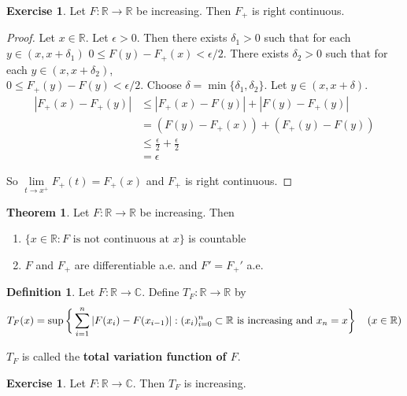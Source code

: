 \documentclass[12pt]{amsart}
\theoremstyle{definition}
\newtheorem{defn}[definition]{Definition}
\newtheorem{thm}[definition]{Theorem}
\newtheorem{ex}[definition]{Exercise}
\newcommand{\del}{\delta}
\newcommand{\ep}{\epsilon}
\newcommand{\C}{\mathbb{C}}
\newcommand{\R}{\mathbb{R}}
\newcommand{\lex}[1]{\label{ex:#1}}
\newcommand{\ld}[1]{\label{defn:#1}}
\begin{document}
	\begin{ex} \lex{00000} 
		Let $F:\R \rightarrow \R$ be increasing. Then $F_+$ is right continuous. 
	\end{ex}
	
	\begin{proof}
		Let $x \in \R$. Let $\ep >0$. Then there exists $\del_1>0$ such that for each $y \in (x,x+\del_1)$ $0 \leq F(y)-F_+(x) < \ep/2$. There exists $\del_2 >0$ such that for each $y \in (x,x+\del_2)$, \\$0 \leq F_+(y)-F(y) < \ep/2$. Choose $\del = \min\{\del_1, \del_2\}$. Let $y \in (x, x+\del)$.
		\begin{align*}
			|F_+(x) - F_+(y)|
			& \leq |F_+(x) - F(y)| + |F(y)- F_+(y)| \\
			& = (F(y) - F_+(x)) + (F_+(y) - F(y)) \\
			& \leq \frac{\ep}{2} + \frac{\ep}{2}\\
			& = \ep
		\end{align*}
		
		So $\lim\limits_{t \rightarrow x^+} F_+(t) = F_+(x)$ and $F_+$ is right continuous.
	\end{proof}
	
	\begin{thm}
		Let $F:\R \rightarrow \R$ be increasing. Then 
		\begin{enumerate}
			\item $\{x \in \R: F \text{ is not continuous at }x\}$ is countable
			\item $F$ and $F_+$ are differentiable a.e. and $F' = F_+'$ a.e.
		\end{enumerate}
	\end{thm}
	
	\begin{defn} \ld{00000} 
		Let $F:\R \rightarrow \C$. Define $T_F:\R \rightarrow \R$ by $$T_F(x) = \sup\bigg \{\sum_{i=1}^{n}|F(x_{i}) - F(x_{i-1})|: (x_i)_{i=0}^n \subset \R \text{ is increasing and } x_n=x  \bigg \} \hspace{4mm} (x \in \R)$$
		
		$T_F$ is called the \textbf{total variation function of $F$}.
	\end{defn}
	
	\begin{ex} \lex{00000} 
		Let $F:\R \rightarrow \C$. Then $T_F$ is increasing.
	\end{ex}
	
\end{document}
